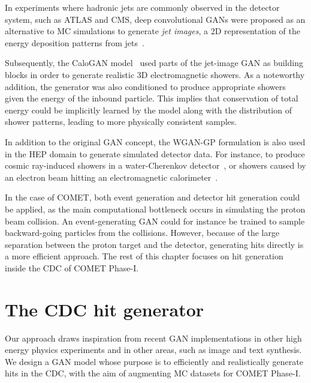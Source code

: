 In experiments where hadronic jets are commonly observed in the detector system,
such as ATLAS and CMS, deep convolutional GANs were proposed as an alternative
to MC simulations to generate \emph{jet images}, a 2D representation of the
energy deposition patterns from jets~\cite{deOliveira2017a}.

Subsequently, the {\sc CaloGAN} model~\cite{paganini_calogan_2018} used parts of
the jet-image GAN as building blocks in order to generate realistic 3D
electromagnetic showers. As a noteworthy addition, the generator was also
conditioned to produce appropriate showers given the energy of the inbound
particle. This implies that conservation of total energy could be implicitly
learned by the model along with the distribution of shower patterns, leading to
more physically consistent samples.


In addition to the original GAN concept, the WGAN-GP formulation is also used in
the HEP domain to generate simulated detector data. For instance, to produce
cosmic ray-induced showers in a water-Cherenkov detector~\cite{Erdmann2018}, or
showers caused by an electron beam hitting an electromagnetic
calorimeter~\cite{Erdmann2019}.

In the case of COMET, both event generation and detector hit generation could be
applied, as the main computational bottleneck occurs in simulating the proton
beam collision. An event-generating GAN could for instance be trained to sample
backward-going particles from the collisions. However, because of the large
separation between the proton target and the detector, generating hits directly
is a more efficient approach. The rest of this chapter focuses on hit
generation inside the CDC of COMET Phase-I.





\section{The CDC hit generator}
Our approach draws inspiration from recent GAN implementations in other high
energy physics experiments and in other areas, such as image and text
synthesis. We design a GAN model whose purpose is to efficiently and
realistically generate hits in the CDC, with the aim of augmenting MC datasets
for COMET Phase-I.

